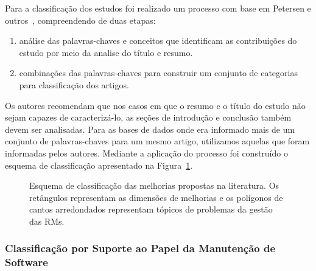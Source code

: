 Para a classificação dos estudos foi realizado um processo com base em Petersen
e outros~\cite{Petersen2008}, compreendendo de duas etapas:

\begin{enumerate}[I]
	\item análise das palavras-chaves e conceitos que
		identificam as contribuições do estudo por meio da analise do título e
		resumo.
	\item combinações das palavras-chaves para construir um conjunto de
		categorias para classificação dos artigos.
\end{enumerate}

Os autores recomendam que nos casos em que o resumo e o título do estudo não
sejam capazes de caracterizá-lo, as seções de introdução e conclusão também
devem ser analisadas. Para as bases de dados onde era informado mais de um
conjunto de palavras-chaves para um mesmo artigo, utilizamos aquelas que foram
informadas pelos autores. Mediante a aplicação do processo foi construído o
esquema de classificação apresentado na
Figura~\ref{fig:diagrama-esquema-dimensao-melhorias}.

\begin{figure}[tb] \centering
	\caption{Esquema de classificação das melhorias propostas na literatura. Os
		retângulos representam as dimensões de melhorias e os polígonos de
		cantos arredondados representam tópicos de problemas da gestão das
		RMs.}
\label{fig:diagrama-esquema-dimensao-melhorias}
\end{figure}

\subsubsection{Classificação por Suporte ao Papel da Manutenção de Software}
\label{subsubsec:map-esquema-suporte-papel-man}

